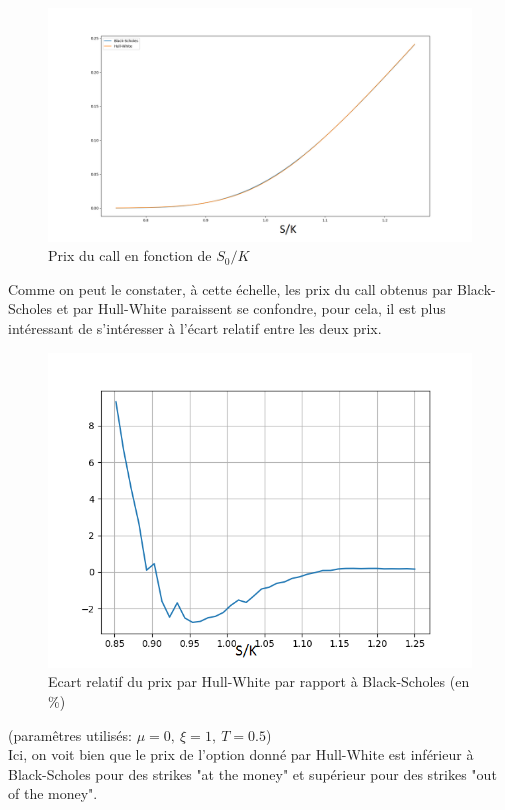 \documentclass{report}
\begin{document}
\begin{figure}[H]
\begin{center}
\includegraphics[scale=0.4]{figure_1.png}
\end{center}
\caption{Prix du call en fonction de $S_0/K$}
\end{figure}
Comme on peut le constater, à cette échelle, les prix du call obtenus par Black-Scholes et par Hull-White paraissent se confondre, pour cela, il est plus intéressant de s'intéresser à l'écart relatif entre les deux prix.
\begin{figure}[H]
\begin{center}
\includegraphics[scale=0.8]{figure_2.png}
\end{center}
\caption{Ecart relatif du prix par Hull-White par rapport à Black-Scholes (en \%)}
\end{figure} 
(paramêtres utilisés: $\mu = 0,\ \xi = 1,\ T = 0.5$)\\
Ici, on voit bien que le prix de l'option donné par Hull-White est inférieur à Black-Scholes pour des strikes "at the money" et supérieur pour des strikes "out of the money".\\ 	
\end{document}
